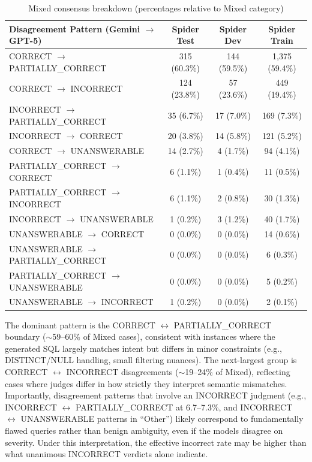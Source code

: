 \documentclass[print]{einformatica}
\begin{document}
\begin{table}[ht]
    \caption{Mixed consensus breakdown (percentages relative to Mixed category)}
    \label{tab:mixed_breakdown}
    \centering
    \footnotesize
    \begin{tabular}{lccc}
        \toprule
        \textbf{Disagreement Pattern (Gemini $\rightarrow$ GPT-5)} & \textbf{Spider Test} & \textbf{Spider Dev} & \textbf{Spider Train} \\
        \midrule
        CORRECT $\rightarrow$ PARTIALLY\_CORRECT & 315 (60.3\%) & 144 (59.5\%) & 1,375 (59.4\%) \\
        CORRECT $\rightarrow$ INCORRECT & 124 (23.8\%) & 57 (23.6\%) & 449 (19.4\%) \\
        INCORRECT $\rightarrow$ PARTIALLY\_CORRECT & 35 (6.7\%) & 17 (7.0\%) & 169 (7.3\%) \\
        INCORRECT $\rightarrow$ CORRECT & 20 (3.8\%) & 14 (5.8\%) & 121 (5.2\%) \\
        CORRECT $\rightarrow$ UNANSWERABLE & 14 (2.7\%) & 4 (1.7\%) & 94 (4.1\%) \\
        PARTIALLY\_CORRECT $\rightarrow$ CORRECT & 6 (1.1\%) & 1 (0.4\%) & 11 (0.5\%) \\
        PARTIALLY\_CORRECT $\rightarrow$ INCORRECT & 6 (1.1\%) & 2 (0.8\%) & 30 (1.3\%) \\
        INCORRECT $\rightarrow$ UNANSWERABLE & 1 (0.2\%) & 3 (1.2\%) & 40 (1.7\%) \\
        UNANSWERABLE $\rightarrow$ CORRECT & 0 (0.0\%) & 0 (0.0\%) & 14 (0.6\%) \\
        UNANSWERABLE $\rightarrow$ PARTIALLY\_CORRECT & 0 (0.0\%) & 0 (0.0\%) & 6 (0.3\%) \\
        PARTIALLY\_CORRECT $\rightarrow$ UNANSWERABLE & 0 (0.0\%) & 0 (0.0\%) & 5 (0.2\%) \\
        UNANSWERABLE $\rightarrow$ INCORRECT & 1 (0.2\%) & 0 (0.0\%) & 2 (0.1\%) \\
        \bottomrule
    \end{tabular}
\end{table}

The dominant pattern is the CORRECT $\leftrightarrow$ PARTIALLY\_CORRECT boundary ($\sim$59--60\% of Mixed cases), consistent with instances where the generated SQL largely matches intent but differs in minor constraints (e.g., DISTINCT/NULL handling, small filtering nuances). The next-largest group is CORRECT $\leftrightarrow$ INCORRECT disagreements ($\sim$19--24\% of Mixed), reflecting cases where judges differ in how strictly they interpret semantic mismatches. Importantly, disagreement patterns that involve an INCORRECT judgment (e.g., INCORRECT $\leftrightarrow$ PARTIALLY\_CORRECT at 6.7--7.3\%, and INCORRECT $\leftrightarrow$ UNANSWERABLE patterns in ``Other'') likely correspond to fundamentally flawed queries rather than benign ambiguity, even if the models disagree on severity. Under this interpretation, the effective incorrect rate may be higher than what unanimous INCORRECT verdicts alone indicate.
\end{document}

